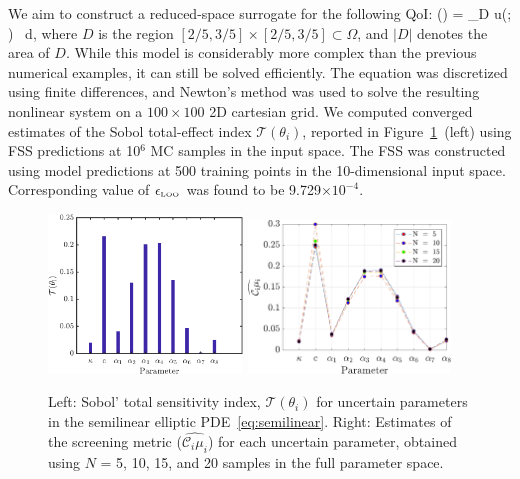 We aim to construct a reduced-space surrogate for the following QoI:
\be
{}(\vec\theta) =  \int_D u(; \vec\theta) \, d, 
\label{eq:qoi}
\ee
%
where $D$ is the region $[2/5, 3/5] \times [2/5, 3/5] \subset \Omega$, 
and $|D|$ denotes the area of $D$. 
While this model is considerably more complex than the previous numerical
examples, it can still be solved efficiently.
The equation was discretized using finite differences, and Newton's method
was used to solve the resulting nonlinear system on a $100 \times 100$ 2D
cartesian grid.
We computed converged estimates of the Sobol
total-effect index $\mathcal{T}(\theta_i)$, reported 
in Figure~\ref{fig:sense_elliptic}~(left) using FSS predictions at 10$^6$
MC samples in the input space. The FSS was 
constructed using model predictions at 500 training points in the 10-dimensional
input space. Corresponding value of $\epsilon_\text{\tiny{LOO}}$ was 
found to be 9.729$\times 10^{-4}$. 
%
\begin{figure}[htbp]
 \begin{center}
  \includegraphics[width=0.46\textwidth]{./Figures/sense_elliptic}
  \includegraphics[width=0.48\textwidth]{./Figures/ub_conv_elliptic}
\caption{
Left: Sobol' total sensitivity index, $\mathcal{T}(\theta_i)$ for uncertain parameters in the 
semilinear elliptic PDE~\eqref{eq:semilinear}. Right: 
Estimates of the screening metric ($\widehat{\mathcal{C}_i\mu_i}$) for each uncertain parameter,
obtained using $N$ = 5, 10, 15, and 20 samples in the full parameter space.}
\label{fig:sense_elliptic}
\end{center}
\end{figure}
